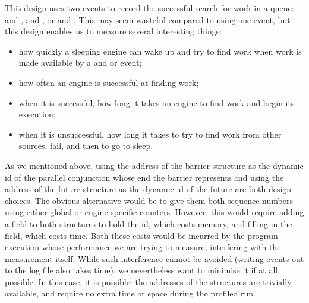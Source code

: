 This design uses two events to record
the successful search for work in a queue:
 and ,
 and ,
or  and .
This may seem wasteful compared to using one event,
but this design enables us to measure several interesting things:

\begin{itemize}
\item
how quickly a sleeping engine can wake up and try to find work
when work is made available by a  and or
 event;
\item
how often an engine is successful at finding work;
\item
when it is successful,
how long it takes an engine to find work and begin its execution;
\item
when it is unsuccessful,
how long it takes to try to find work from other sources,
fail, and then to go to sleep.
\end{itemize}


As we mentioned above,
using the address of the barrier structure
as the dynamic id of the parallel conjunction whose end the barrier represents
and using the address of the future structure
as the dynamic id of the future
are both design choices.
The obvious alternative would be to give them both sequence numbers
using either global or engine-specific counters.
However, this would require
adding a field to both structures to hold the id, which costs memory, and
filling in the field, which costs time.
Both these costs would be incurred by the program execution
whose performance we are trying to measure,
interfering with the measurement itself.
While such interference cannot be avoided
(writing events out to the log file also takes time),
we nevertheless want to minimise it if at all possible.
In this case, it is possible:
the addresses of the structures are trivially available,
and require no extra time or space during the profiled run.


